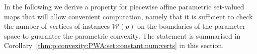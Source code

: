 %
%
%
In the following we derive a property for piecewise affine parametric set-valued maps that will
allow convenient computation, namely that it is sufficient to check the number of vertices of 
instances $\mathcal W(p)$ on the boundaries of the parameter space to guarantee the parametric convexity.
%
The statement is summarised in Corollary~\ref{thm:p:convexity:PWA:set:constant:num:verts} in this section.
